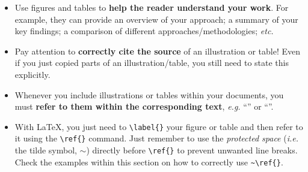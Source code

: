 \documentclass[11pt,a4paper]{article}
\begin{document}
\begin{itemize}

\item Use figures and tables to \textbf{help the reader understand your work}. For example, they can provide an overview of your approach; a summary of your key findings; a comparison of different approaches/methodologies; \emph{etc.}
 
\item Pay attention to \textbf{correctly cite the source} of an illustration or table! Even if you just copied parts of an illustration/table, you still need to state this explicitly.

 
\item Whenever you include illustrations or tables within your documents, you must \textbf{refer to them within the corresponding text}, \emph{e.g.} ``'' or ``''.

\item With \LaTeX, you just need to \verb,\label{}, your figure or table and then refer to it using the \verb,\ref{}, command.
Just remember to use the \emph{protected space} (\emph{i.e.} the tilde symbol, $\sim$) directly before \verb,\ref{}, to prevent unwanted line breaks.
Check the examples within this section on how to correctly use \verb,~\ref{},.

\end{itemize}
\end{document}
